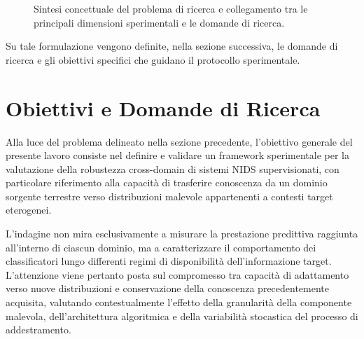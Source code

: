 \begin{figure}[H]

    \caption{
        Sintesi concettuale del problema di ricerca e collegamento tra le principali dimensioni sperimentali e le domande di ricerca.
    }
    \label{fig:problema_ricerca_rq}
\end{figure}

Su tale formulazione vengono definite, nella sezione successiva, le domande di ricerca e gli obiettivi specifici che guidano il protocollo sperimentale.




\section{Obiettivi e Domande di Ricerca}
\label{sec:intro_obiettivi}

Alla luce del problema delineato nella sezione precedente, l'obiettivo generale del presente lavoro consiste nel definire e validare un framework sperimentale per la valutazione della robustezza cross-domain di sistemi NIDS supervisionati, con particolare riferimento alla capacità di trasferire conoscenza da un dominio sorgente terrestre verso distribuzioni malevole appartenenti a contesti target eterogenei.

L'indagine non mira esclusivamente a misurare la prestazione predittiva raggiunta all'interno di ciascun dominio, ma a caratterizzare il comportamento dei classificatori lungo differenti regimi di disponibilità dell'informazione target. 
L'attenzione viene pertanto posta sul compromesso tra capacità di adattamento verso nuove distribuzioni e conservazione della conoscenza precedentemente acquisita, valutando contestualmente l'effetto della granularità della componente malevola, dell'architettura algoritmica e della variabilità stocastica del processo di addestramento.

